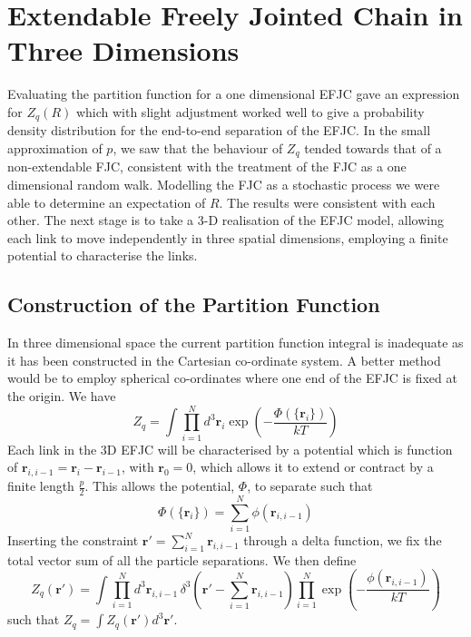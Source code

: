 \newpage
\section{Extendable Freely Jointed Chain in Three Dimensions}

Evaluating the partition function for a one dimensional EFJC gave an expression for $Z_{q}(R)$ which with slight adjustment worked well to give a probability density distribution for the end-to-end separation of the EFJC. In the small approximation of $p$, we saw that the behaviour of $Z_{q}$ tended towards that of a non-extendable FJC, consistent with the treatment of the FJC as a one dimensional random walk. Modelling the FJC as a stochastic process we were able to determine an expectation of $R$. The results were consistent with each other. The next stage is to take a 3-D realisation of the EFJC model, allowing each link to move independently in three spatial dimensions, employing a finite potential to characterise the links.

\subsection{Construction of the Partition Function}

In three dimensional space the current partition function integral is inadequate as it has been constructed in the Cartesian co-ordinate system. A better method would be to employ spherical co-ordinates where one end of the EFJC is fixed at the origin. We have
%
\begin{equation}
Z_{q}=\int \prod_{i=1}^{N}d^{3}\boldsymbol{r}_{i} \exp\left(-\frac{\Phi\left(\{\boldsymbol{r}_{i}\}\right)}{kT}\right)
\end{equation}
%
Each link in the 3D EFJC will be characterised by a potential which is function of $\boldsymbol{r}_{i,i-1}=\boldsymbol{r}_{i}-\boldsymbol{r}_{i-1}$, with $\boldsymbol{r}_{0}=0$, which allows it to extend or contract by a finite length $\frac{p}{2}$. This allows the potential, $\Phi$, to separate such that
%
\begin{equation}
\Phi\left(\{\boldsymbol{r}_{i}\}\right) = \sum_{i=1}^{N}\phi\left(\boldsymbol{r}_{i,i-1}\right)
\end{equation}
%
Inserting the constraint $\boldsymbol{r}'=\sum_{i=1}^{N}\boldsymbol{r}_{i,i-1}$ through a delta function, we fix the total vector sum of all the particle separations. We then define
%
\begin{equation}
Z_{q}\left(\boldsymbol{r}'\right)=\int\prod_{i=1}^{N}d^{3}\boldsymbol{r}_{i,i-1}\,\delta^{3}\left(\boldsymbol{r'}-\sum_{i=1}^{N}\boldsymbol{r}_{i,i-1}\right)\prod_{i=1}^{N} \exp\left(-\frac{\phi\left(\boldsymbol{r}_{i,i-1}\right)}{kT}\right)\label{pf3d1}
\end{equation}
%
such that $Z_{q}=\int Z_{q}\left(\boldsymbol{r}'\right)d^{3}\boldsymbol{r}'$.

